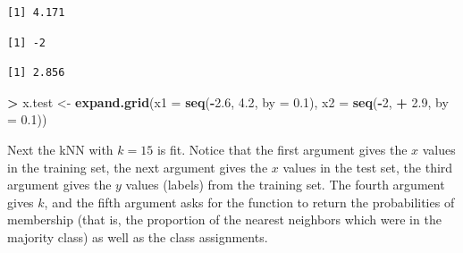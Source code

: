 \documentclass[]{krantz}
\makeatletter
\newenvironment{Shaded}{\begin{snugshade}}{\end{snugshade}}
\newcommand{\DataTypeTok}[1]{\textcolor[rgb]{0.27,0.27,0.27}{#1}}
\newcommand{\DecValTok}[1]{\textcolor[rgb]{0.06,0.06,0.06}{#1}}
\newcommand{\FloatTok}[1]{\textcolor[rgb]{0.06,0.06,0.06}{#1}}
\newcommand{\KeywordTok}[1]{\textcolor[rgb]{0.27,0.27,0.27}{\textbf{#1}}}
\newcommand{\NormalTok}[1]{#1}
\newcommand{\OperatorTok}[1]{\textcolor[rgb]{0.43,0.43,0.43}{\textbf{#1}}}
\newcommand{\StringTok}[1]{\textcolor[rgb]{0.5,0.5,0.5}{#1}}
\newenvironment{kframe}{%
\medskip{}
\setlength{\fboxsep}{.8em}
 \def\at@end@of@kframe{}%
 \ifinner\ifhmode%
  \def\at@end@of@kframe{\end{minipage}}%
  \begin{minipage}{\columnwidth}%
 \fi\fi%
 \def\FrameCommand##1{\hskip\@totalleftmargin \hskip-\fboxsep
 \colorbox{shadecolor}{##1}\hskip-\fboxsep
     \hskip-\linewidth \hskip-\@totalleftmargin \hskip\columnwidth}%
 \MakeFramed {\advance\hsize-\width
   \@totalleftmargin\z@ \linewidth\hsize
   \@setminipage}}%
 {\par\unskip\endMakeFramed%
 \at@end@of@kframe}
\renewenvironment{Shaded}{\begin{kframe}}{\end{kframe}}
\makeatother
\begin{document}
\begin{Shaded}
\end{Shaded}

\begin{verbatim}
[1] 4.171
\end{verbatim}

\begin{Shaded}
\end{Shaded}

\begin{verbatim}
[1] -2
\end{verbatim}

\begin{Shaded}
\end{Shaded}

\begin{verbatim}
[1] 2.856
\end{verbatim}

\begin{Shaded}
\begin{Highlighting}[]
\OperatorTok{>}\StringTok{ }\NormalTok{x.test <-}\StringTok{ }\KeywordTok{expand.grid}\NormalTok{(}\DataTypeTok{x1 =} \KeywordTok{seq}\NormalTok{(}\OperatorTok{-}\FloatTok{2.6}\NormalTok{, }\FloatTok{4.2}\NormalTok{, }\DataTypeTok{by =} \FloatTok{0.1}\NormalTok{), }\DataTypeTok{x2 =} \KeywordTok{seq}\NormalTok{(}\OperatorTok{-}\DecValTok{2}\NormalTok{, }
\OperatorTok{+}\StringTok{   }\FloatTok{2.9}\NormalTok{, }\DataTypeTok{by =} \FloatTok{0.1}\NormalTok{))}
\end{Highlighting}
\end{Shaded}

Next the kNN with \(k=15\) is fit. Notice that the first argument gives the \(x\) values in the training set, the next argument gives the \(x\) values in the test set, the third argument gives the \(y\) values (labels) from the training set. The fourth argument gives \(k\), and the fifth argument asks for the function to return the probabilities of membership (that is, the proportion of the nearest neighbors which were in the majority class) as well as the class assignments.
\end{document}
